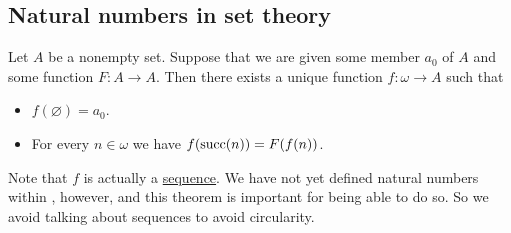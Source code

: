 \subsection{Natural numbers in set theory}\label{subsec:natural_numbers_in_set_theory}

\begin{theorem}\label{thm:omega_recursion}
  Let \( A \) be a nonempty set. Suppose that we are given some member \( a_0 \) of \( A \) and some function \( F: A \to A \). Then there exists a unique function \( f: \omega \to A \) such that
  \begin{itemize}
    \item \( f(\varnothing) = a_0 \).
    \item For every \( n \in \omega \) we have \( f(\operatorname{succ}(n)) = F(f(n)) \).
  \end{itemize}

  Note that \( f \) is actually a \hyperref[def:sequence]{sequence}. We have not yet defined natural numbers within , however, and this theorem is important for being able to do so. So we avoid talking about sequences to avoid circularity.
\end{theorem}
